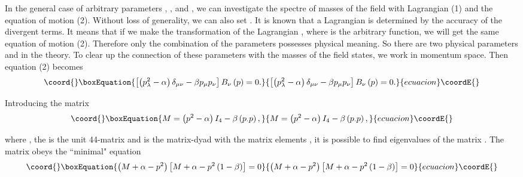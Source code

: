 \documentclass[a4paper,12pt]{article}
\begin{document}
In the general case of arbitrary parameters \coordHE{}, \coordHE{}, \coordHE{} and
\myHighlight{$\alpha$}\coordHE{}, we can investigate the spectre of masses of the field
\coordHE{} with Lagrangian (1) and the equation of motion (2).
Without loss of generality, we can also set \coordHE{}. It is known
that a Lagrangian is determined by the accuracy of the divergent
terms. It means that if we make the transformation of the
Lagrangian \coordHE{}, where \myHighlight{$\Lambda _\mu $}\coordHE{} is the arbitrary function,
we will get the same equation of motion (2). Therefore only the
combination of the parameters \coordHE{} possesses
physical meaning. So there are two physical parameters \myHighlight{$\alpha $}\coordHE{}
and \myHighlight{$\beta $}\coordHE{} in the theory. To clear up the connection of these
parameters with the masses of the field states, we work in
momentum space. Then equation (2) becomes
\begin{equation}\coord{}\boxEquation{
\left[ \left( p_\lambda ^2-\alpha \right) \delta _{\mu \nu }-\beta
p_\mu p_\nu \right] B_\nu \left( p\right) =0.  \label{5}
}{
\left[ \left( p_\lambda ^2-\alpha \right) \delta _{\mu \nu }-\beta
p_\mu p_\nu \right] B_\nu \left( p\right) =0.  }{ecuacion}\coordE{}\end{equation}

Introducing the matrix
\begin{equation}\coord{}\boxEquation{
M=\left( p^2-\alpha \right) I_4-\beta \left( p_{\cdot }p\right),
\label{6}
}{
M=\left( p^2-\alpha \right) I_4-\beta \left( p_{\cdot }p\right),
}{ecuacion}\coordE{}\end{equation}

where \coordHE{}, the
\coordHE{} is the unit 4\myHighlight{$\times $}\coordHE{}4-matrix and \coordHE{} is the matrix-dyad with the matrix elements \coordHE{}, it is possible to
find eigenvalues of the matrix \coordHE{} . The matrix \coordHE{} obeys the
``minimal" equation
\begin{equation}\coord{}\boxEquation{
\left( M+\alpha -p^2\right) \left[ M+\alpha -p^2\left( 1-\beta
\right) \right] =0  \label{7}
}{
\left( M+\alpha -p^2\right) \left[ M+\alpha -p^2\left( 1-\beta
\right) \right] =0  }{ecuacion}\coordE{}\end{equation}
\end{document}
